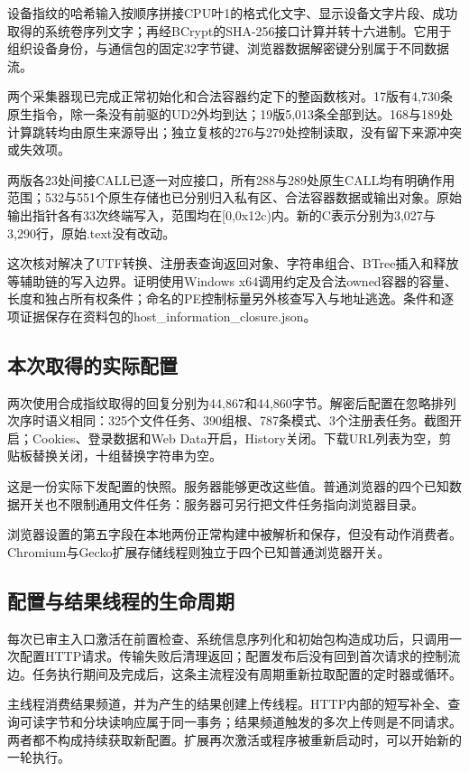 \documentclass[UTF8,a4paper,zihao=5,fontset=windows]{ctexart}
\newcommand{\code}[1]{{\ttfamily\small #1}}
\begin{document}
设备指纹的哈希输入按顺序拼接CPU叶1的格式化文字、显示设备文字片段、成功取得的系统卷序列文字；再经BCrypt的SHA-256接口计算并转十六进制。它用于组织设备身份，与通信包的固定32字节键、浏览器数据解密键分别属于不同数据流。

两个采集器现已完成正常初始化和合法容器约定下的整函数核对。17版有4,730条原生指令，除一条没有前驱的\code{UD2}外均到达；19版5,013条全部到达。168与189处计算跳转均由原生来源导出；独立复核的276与279处控制读取，没有留下来源冲突或失效项。

两版各23处间接CALL已逐一对应接口，所有288与289处原生CALL均有明确作用范围；532与551个原生存储也已分别归入私有区、合法容器数据或输出对象。原始输出指针各有33次终端写入，范围均在\code{[0,0x12c)}内。新的C表示分别为3,027与3,290行，原始\code{.text}没有改动。

这次核对解决了UTF转换、注册表查询返回对象、字符串组合、BTree插入和释放等辅助链的写入边界。证明使用Windows x64调用约定及合法owned容器的容量、长度和独占所有权条件；命名的PE控制标量另外核查写入与地址逃逸。条件和逐项证据保存在资料包的\code{host\_information\_closure.json}。

\subsection{本次取得的实际配置}
两次使用合成指纹取得的回复分别为44,867和44,860字节。解密后配置在忽略排列次序时语义相同：325个文件任务、390组根、787条模式、3个注册表任务。截图开启；Cookies、登录数据和Web Data开启，History关闭。下载URL列表为空，剪贴板替换关闭，十组替换字符串为空。

这是一份实际下发配置的快照。服务器能够更改这些值。普通浏览器的四个已知数据开关也不限制通用文件任务：服务器可另行把文件任务指向浏览器目录。

浏览器设置的第五字段在本地两份正常构建中被解析和保存，但没有动作消费者。Chromium与Gecko扩展存储线程则独立于四个已知普通浏览器开关。

\subsection{配置与结果线程的生命周期}
每次已审主入口激活在前置检查、系统信息序列化和初始包构造成功后，只调用一次配置HTTP请求。传输失败后清理返回；配置发布后没有回到首次请求的控制流边。任务执行期间及完成后，这条主流程没有周期重新拉取配置的定时器或循环。

主线程消费结果频道，并为产生的结果创建上传线程。HTTP内部的短写补全、查询可读字节和分块读响应属于同一事务；结果频道触发的多次上传则是不同请求。两者都不构成持续获取新配置。扩展再次激活或程序被重新启动时，可以开始新的一轮执行。
\end{document}
